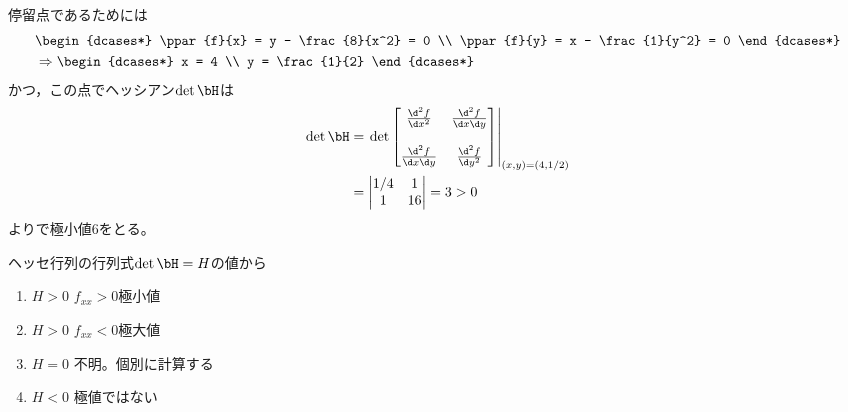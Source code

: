 \begin{ans*}
  停留点であるためには
  \begin{align}
    &\begin{dcases*}
      \ppar{f}{x} = y - \frac{8}{x^2} = 0 \\
      \ppar{f}{y} = x - \frac{1}{y^2} = 0
    \end{dcases*}\\
    &\Rightarrow
    \begin{dcases*}
      x = 4 \\
      y = \frac{1}{2}
    \end{dcases*}
  \end{align}
  かつ，この点でヘッシアン$\det\bH$は
  \begin{align}
    \det\bH
    &=
    \left.
    \det 
    \begin{bmatrix}
    \frac{\d^2f}{\d x^2} & \frac{\d^2f}{\d x\d y} \\
    \\
    \frac{\d^2f}{\d x\d y} & \frac{\d^2f}{\d y^2}
    \end{bmatrix}\right|_{(x,y) = (4,1/2)} \\
    &=
    \begin{vmatrix}
      1/4 & 1 \\
      1 & 16
    \end{vmatrix}
    = 3 > 0
  \end{align}
  よりで極小値6をとる。
\end{ans*}
\begin{supple*}
  ヘッセ行列の行列式$\det\bH=H$の値から
  
  \begin{enumerate}[label=\arabic*.]
    \item $H>0$ \land\: $f_{xx}>0$\Rightarrow 極小値
    \item $H>0$ \land\: $f_{xx}<0$\Rightarrow 極大値
    \item $H=0$ \Rightarrow 不明。個別に計算する %
    \item $H<0$ \Rightarrow 極値ではない
  \end{enumerate}
  
\end{supple*}

